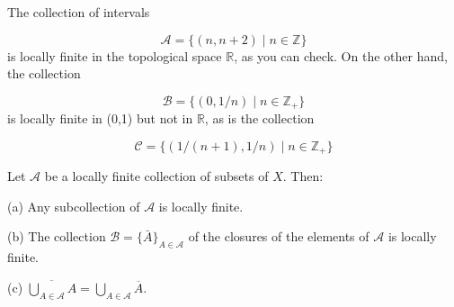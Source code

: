 \begin{centeredblock*}
\begin{example}
\label{ex:\thesection.\theexample}
 The collection of intervals

\[
\mathcal{A} = \{ ({n,n + 2}) \mid n \in \mathbb{Z}\}
\]
is locally finite in the topological space \(\mathbb{R}\), as you can check. On the other hand, the collection

\[
\mathcal{B} = \{ {({0,1/n}) \mid n \in {\mathbb{Z}}_{ + }}\}
\]
is locally finite in (0,1) but not in \(\mathbb{R}\), as is the collection

\[
\mathcal{C} = \{ {({1/({n + 1}),1/n}) \mid n \in {\mathbb{Z}}_{ + }}\}
\]
\end{example}
\end{centeredblock*}

\begin{lemma}
\label{lem:\thetheorem}
 Let \(\mathcal{A}\) be a locally finite collection of subsets of \(X\). Then:

(a) Any subcollection of \(\mathcal{A}\) is locally finite.

(b) The collection \(\mathcal{B} = \{ \bar{A} \}_{A \in \mathcal{A}}\) of the closures of the elements of \(\mathcal{A}\) is locally finite.

(c) \(\overline{\mathop{\bigcup }\limits_{{A \in \mathcal{A}}}A} = \mathop{\bigcup }\limits_{{A \in \mathcal{A}}}\overline{A}\).
\end{lemma}

